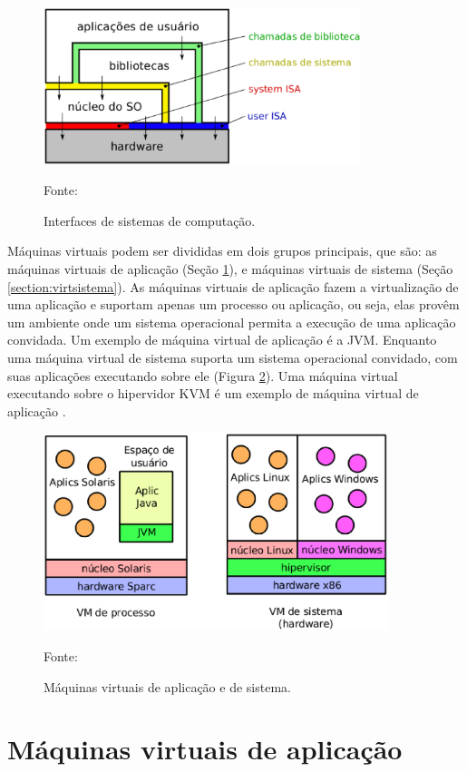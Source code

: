\begin{figure}[interfaces_isa]
 \centering
 \includegraphics[width=350px]{img/interfaces_isa.eps}
 \caption{Interfaces de sistemas de computação.}
 \label{fig:interfaces_isa}
 Fonte: \citet{maziero2013}
\end{figure}

Máquinas virtuais podem ser divididas em dois grupos principais, que são: as máquinas virtuais de aplicação (Seção \ref{section:virtaplicacao}), 
e máquinas virtuais de sistema (Seção \ref{section:virtsistema}). As máquinas virtuais de aplicação fazem a virtualização de uma 
aplicação e suportam apenas um processo ou aplicação, ou seja, elas provêm um ambiente onde um sistema operacional permita a execução de
uma aplicação convidada. Um exemplo de máquina virtual de aplicação é a \ac{JVM}. Enquanto uma máquina virtual de sistema suporta um sistema
operacional convidado, com suas aplicações executando sobre ele (Figura \ref{fig:vms_tipos}). Uma máquina virtual executando sobre o 
hipervidor \ac{KVM} é um exemplo de máquina virtual de aplicação \cite{laureano2008}.

\begin{figure}[vms_tipos]
 \centering
 \includegraphics[width=380px]{img/vms_tipos.eps}
 \caption{Máquinas virtuais de aplicação e de sistema.}
 \label{fig:vms_tipos}
 Fonte: \citet{laureano2008}
\end{figure}

\section{Máquinas virtuais de aplicação}
\label{section:virtaplicacao}

